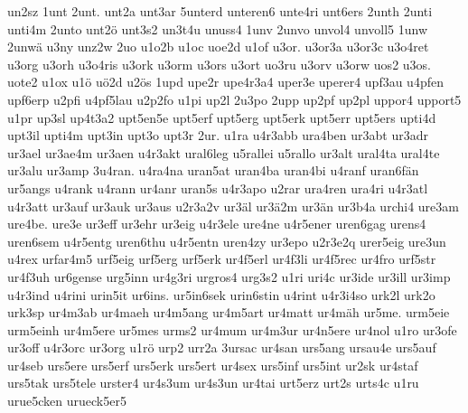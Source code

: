 {    un2sz
    1unt
    2unt.
    unt2a
    unt3ar
    5unterd
    unteren6
    unte4ri
    unt6ers
    2unth
    2unti
    unti4m
    2unto
    unt2ö
    unt3s2
    un3t4u
    unuss4
    1unv
    2unvo
    unvol4
    unvoll5
    1unw
    2unwä
    u3ny
    unz2w
    2uo
    u1o2b
    u1oc
    uoe2d
    u1of
    u3or.
    u3or3a
    u3or3c
    u3o4ret
    u3org
    u3orh
    u3o4ris
    u3ork
    u3orm
    u3ors
    u3ort
    uo3ru
    u3orv
    u3orw
    uos2
    u3os.
    uote2
    u1ox
    u1ö
    uö2d
    u2ös
    1upd
    upe2r
    upe4r3a4
    uper3e
    uperer4
    upf3au
    u4pfen
    upf6erp
    u2pfi
    u4pf5lau
    u2p2fo
    u1pi
    up2l
    2u3po
    2upp
    up2pf
    up2pl
    uppor4
    upport5
    u1pr
    up3sl
    up4t3a2
    upt5en5e
    upt5erf
    upt5erg
    upt5erk
    upt5err
    upt5ers
    upti4d
    upt3il
    upti4m
    upt3in
    upt3o
    upt3r
    2ur.
    u1ra
    u4r3abb
    ura4ben
    ur3abt
    ur3adr
    ur3ael
    ur3ae4m
    ur3aen
    u4r3akt
    ural6leg
    u5rallei
    u5rallo
    ur3alt
    ural4ta
    ural4te
    ur3alu
    ur3amp
    3u4ran.
    u4ra4na
    uran5at
    uran4ba
    uran4bi
    u4ranf
    uran6fän
    ur5angs
    u4rank
    u4rann
    ur4anr
    uran5s
    u4r3apo
    u2rar
    ura4ren
    ura4ri
    u4r3atl
    u4r3att
    ur3auf
    ur3auk
    ur3aus
    u2r3a2v
    ur3äl
    ur3ä2m
    ur3än
    ur3b4a
    urchi4
    ure3am
    ure4be.
    ure3e
    ur3eff
    ur3ehr
    ur3eig
    u4r3ele
    ure4ne
    u4r5ener
    uren6gag
    urens4
    uren6sem
    u4r5entg
    uren6thu
    u4r5entn
    uren4zy
    ur3epo
    u2r3e2q
    urer5eig
    ure3un
    u4rex
    urfar4m5
    urf5eig
    urf5erg
    urf5erk
    ur4f5erl
    ur4f3li
    ur4f5rec
    ur4fro
    urf5str
    ur4f3uh
    ur6gense
    urg5inn
    ur4g3ri
    urgros4
    urg3s2
    u1ri
    uri4c
    ur3ide
    ur3ill
    ur3imp
    u4r3ind
    u4rini
    urin5it
    ur6ins.
    ur5in6sek
    urin6stin
    u4rint
    u4r3i4so
    urk2l
    urk2o
    urk3sp
    ur4m3ab
    ur4maeh
    ur4m5ang
    ur4m5art
    ur4matt
    ur4mäh
    ur5me.
    urm5eie
    urm5einh
    ur4m5ere
    ur5mes
    urms2
    ur4mum
    ur4m3ur
    ur4n5ere
    ur4nol
    u1ro
    ur3ofe
    ur3off
    u4r3orc
    ur3org
    u1rö
    urp2
    urr2a
    3ursac
    ur4san
    urs5ang
    ursau4e
    urs5auf
    ur4seb
    urs5ere
    urs5erf
    urs5erk
    urs5ert
    ur4sex
    urs5inf
    urs5int
    ur2sk
    ur4staf
    urs5tak
    urs5tele
    urster4
    ur4s3um
    ur4s3un
    ur4tai
    urt5erz
    urt2s
    urts4c
    u1ru
    urue5cken
    urueck5er5
}
